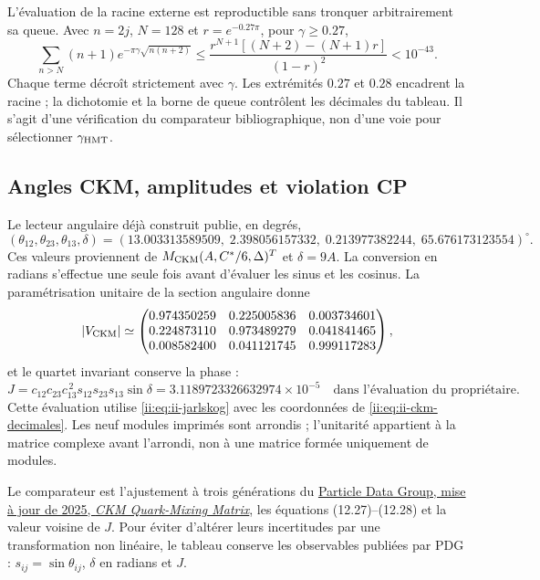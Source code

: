 L’évaluation de la racine externe est reproductible sans tronquer
arbitrairement sa queue. Avec \(n=2j\), \(N=128\) et
\(r=e^{-0.27\pi}\), pour \(\gamma\geq0.27\),
\[
 \sum_{n>N}(n+1)e^{-\pi\gamma\sqrt{n(n+2)}}
 \leq \frac{r^{N+1}[(N+2)-(N+1)r]}{(1-r)^2}<10^{-43}.
\]
Chaque terme décroît strictement avec \(\gamma\). Les extrémités
\(0.27\) et \(0.28\) encadrent la racine ; la dichotomie et la borne de queue
contrôlent les décimales du tableau. Il s’agit d’une vérification du
comparateur bibliographique, non d’une voie pour sélectionner \(\gamma_{\rm HMT}\).

\subsection{Angles CKM, amplitudes et violation CP}

Le lecteur angulaire déjà construit publie, en degrés,
\begin{equation}
 (\theta_{12},\theta_{23},\theta_{13},\delta)
 =(13.003313589509,\;2.398056157332,\;
 0.213977382244,\;65.676173123554)^\circ.
 \label{ii:eq:ii-ckm-decimales}
\end{equation}
Ces valeurs proviennent de \(M_{\rm CKM}(A,C^*/6,\Delta)^T\) et
\(\delta=9A\). La conversion en radians s’effectue une seule fois avant
d’évaluer les sinus et les cosinus. La paramétrisation unitaire de la section
angulaire donne
\[
 |V_{\rm CKM}|\simeq
 \begin{pmatrix}
 0.974350259&0.225005836&0.003734601\\
 0.224873110&0.973489279&0.041841465\\
 0.008582400&0.041121745&0.999117283
 \end{pmatrix},
\]
et le quartet invariant conserve la phase :
\[
 J=c_{12}c_{23}c_{13}^{\,2}s_{12}s_{23}s_{13}\sin\delta
 =3.1189723326632974\times10^{-5}\quad
 \text{dans l'évaluation du propriétaire.}
\]
Cette évaluation utilise \eqref{ii:eq:ii-jarlskog} avec les coordonnées de
\eqref{ii:eq:ii-ckm-decimales}. Les neuf modules imprimés sont arrondis ; l’unitarité appartient
à la matrice complexe avant l’arrondi, non à une matrice formée
uniquement de modules.

Le comparateur est l’ajustement à trois générations du
\href{https://pdg.lbl.gov/2025/reviews/rpp2025-rev-ckm-matrix.pdf}
{Particle Data Group, mise à jour de 2025, \emph{CKM Quark-Mixing Matrix}},
les équations (12.27)--(12.28) et la valeur voisine de \(J\). Pour éviter
d’altérer leurs incertitudes par une transformation non linéaire, le tableau
conserve les observables publiées par PDG : \(s_{ij}=\sin\theta_{ij}\),
\(\delta\) en radians et \(J\).

